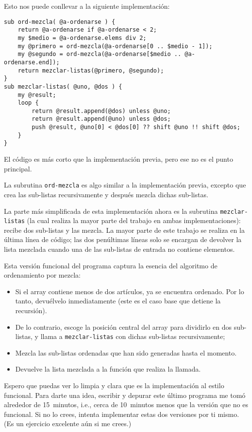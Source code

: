 Esto nos puede conllevar a la siguiente implementación:

\begin{verbatim}
sub ord-mezcla( @a-ordenarse ) {
    return @a-ordenarse if @a-ordenarse < 2;
    my $medio = @a-ordenarse.elems div 2;
    my @primero = ord-mezcla(@a-ordenarse[0 .. $medio - 1]);
    my @segundo = ord-mezcla(@a-ordenarse[$medio .. @a-ordenarse.end]);
    return mezclar-listas(@primero, @segundo);
}
sub mezclar-listas( @uno, @dos ) {
    my @result;
    loop {
        return @result.append(@dos) unless @uno;
        return @result.append(@uno) unless @dos;
        push @result, @uno[0] < @dos[0] ?? shift @uno !! shift @dos;
    }
} 
\end{verbatim}

El código es más corto que la implementación previa, pero
ese no es el punto principal.

La subrutina {\tt ord-mezcla} es algo similar a la implementación 
previa, excepto que crea las sub-listas recursivamente y 
después mezcla dichas sub-listas.

La parte más simplificada de esta implementación ahora es la 
subrutina {\tt mezclar-listas} (la cual realiza la mayor
parte del trabajo en ambas implementaciones): 
recibe dos sub-listas y las mezcla. La mayor parte de este
trabajo se realiza en la última línea de código; las dos penúltimas
líneas solo se encargan de devolver la lista mezclada cuando una
de las sub-listas de entrada no contiene elementos.

Esta versión funcional del programa captura la esencia del algoritmo
de ordenamiento por mezcla:
\begin{itemize}
\item Si el array contiene menos de dos artículos, ya se encuentra
ordenado. Por lo tanto, devuélvelo inmediatamente (este es el caso base
que detiene la recursión).
\item De lo contrario, escoge la posición central del array para dividirlo
en dos sub-listas, y llama a \verb|mezclar-listas| con dichas sub-listas
recursivamente;
\item Mezcla las sub-listas ordenadas que han sido generadas hasta el momento.
\item Devuelve la lista mezclada a la función que realiza la llamada.
\end{itemize}

Espero que puedas ver lo limpia y clara que es la implementación al
estilo funcional. Para darte una idea, escribir y depurar este
último programa me tomó alrededor de 15~minutos, i.e., cerca
de 10~minutos menos que la versión que no es funcional. Si no lo crees,
intenta implementar estas dos versiones por ti mismo. (Es un
ejercicio excelente aún si me crees.)

